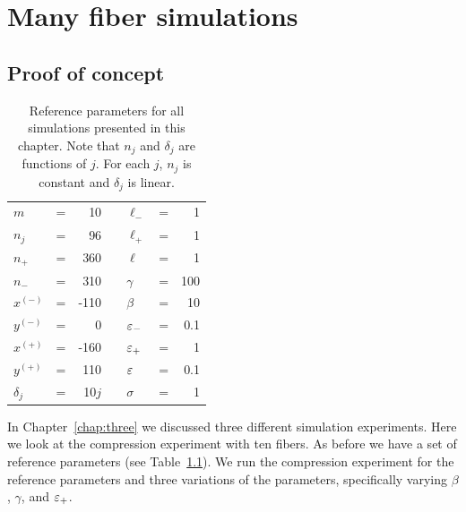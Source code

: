 \chapter{Many fiber simulations} \label{chap:four}

\section{Proof of concept}

	\begin{table}
		\centering
		\caption{Reference parameters for all simulations presented in this chapter. Note that $n_j$ and $\delta_j$ are functions of $j$. For each $j$, $n_j$ is constant and $\delta_j$ is linear. \label{table:manyfiber_reference}}
		\begin{tabular}{lcrclcr}
			$m$ & = & 10 & \hspace{1in} & $\ell_-$ & = & 1 \\
			$n_j$ & = & 96 & & $\ell_+$ & = & 1 \\
			$n_+$ & = & 360 & & $\ell$ & = & 1 \\
			$n_-$ & = & 310 & & $\gamma$ & = & 100 \\
			$x^{(-)}$ & = & -110 & & $\beta$ & = & 10 \\
			$y^{(-)}$ & = & 0 & & $\varepsilon_-$ & = & 0.1 \\
			$x^{(+)}$ & = & -160 & & $\varepsilon_+$ & = & 1 \\
			$y^{(+)}$ & = & 110 & & $\varepsilon$ & = & 0.1 \\
			$\delta_j$ & = & 10$j$ & & $\sigma$ & = & 1
		\end{tabular}
	\end{table}

	In Chapter~\ref{chap:three} we discussed three different simulation experiments. Here we look at the compression experiment with ten fibers. As before we have a set of reference parameters (see Table~\ref{table:manyfiber_reference}). We run the compression experiment for the reference parameters and three variations of the parameters, specifically varying $\beta$, $\gamma$, and $\varepsilon_+$.

